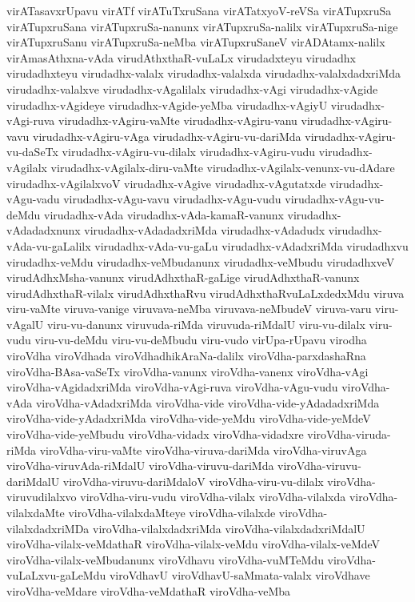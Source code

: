 {virATasavxrUpavu
virATf
virATuTxruSana
virATatxyoV-reVSa
virATupxruSa
virATupxruSana
virATupxruSa-nanunx
virATupxruSa-nalilx
virATupxruSa-nige
virATupxruSanu
virATupxruSa-neMba
virATupxruSaneV
virADAtamx-nalilx
virAmasAthxna-vAda
virudAthxthaR-vuLaLx
virudadxteyu
virudadhx
virudadhxteyu
virudadhx-valalx
virudadhx-valalxda
virudadhx-valalxdadxriMda
virudadhx-valalxve
virudadhx-vAgalilalx
virudadhx-vAgi
virudadhx-vAgide
virudadhx-vAgideye
virudadhx-vAgide-yeMba
virudadhx-vAgiyU
virudadhx-vAgi-ruva
virudadhx-vAgiru-vaMte
virudadhx-vAgiru-vanu
virudadhx-vAgiru-vavu
virudadhx-vAgiru-vAga
virudadhx-vAgiru-vu-dariMda
virudadhx-vAgiru-vu-daSeTx
virudadhx-vAgiru-vu-dilalx
virudadhx-vAgiru-vudu
virudadhx-vAgilalx
virudadhx-vAgilalx-diru-vaMte
virudadhx-vAgilalx-venunx-vu-dAdare
virudadhx-vAgilalxvoV
virudadhx-vAgive
virudadhx-vAgutatxde
virudadhx-vAgu-vadu
virudadhx-vAgu-vavu
virudadhx-vAgu-vudu
virudadhx-vAgu-vu-deMdu
virudadhx-vAda
virudadhx-vAda-kamaR-vanunx
virudadhx-vAdadadxnunx
virudadhx-vAdadadxriMda
virudadhx-vAdadudx
virudadhx-vAda-vu-gaLalilx
virudadhx-vAda-vu-gaLu
virudadhx-vAdadxriMda
virudadhxvu
virudadhx-veMdu
virudadhx-veMbudanunx
virudadhx-veMbudu
virudadhxveV
virudAdhxMsha-vanunx
virudAdhxthaR-gaLige
virudAdhxthaR-vanunx
virudAdhxthaR-vilalx
virudAdhxthaRvu
virudAdhxthaRvuLaLxdedxMdu
viruva
viru-vaMte
viruva-vanige
viruvava-neMba
viruvava-neMbudeV
viruva-varu
viru-vAgalU
viru-vu-danunx
viruvuda-riMda
viruvuda-riMdalU
viru-vu-dilalx
viru-vudu
viru-vu-deMdu
viru-vu-deMbudu
viru-vudo
virUpa-rUpavu
virodha
viroVdha
viroVdhada
viroVdhadhikAraNa-dalilx
viroVdha-parxdashaRna
viroVdha-BAsa-vaSeTx
viroVdha-vanunx
viroVdha-vanenx
viroVdha-vAgi
viroVdha-vAgidadxriMda
viroVdha-vAgi-ruva
viroVdha-vAgu-vudu
viroVdha-vAda
viroVdha-vAdadxriMda
viroVdha-vide
viroVdha-vide-yAdadadxriMda
viroVdha-vide-yAdadxriMda
viroVdha-vide-yeMdu
viroVdha-vide-yeMdeV
viroVdha-vide-yeMbudu
viroVdha-vidadx
viroVdha-vidadxre
viroVdha-viruda-riMda
viroVdha-viru-vaMte
viroVdha-viruva-dariMda
viroVdha-viruvAga
viroVdha-viruvAda-riMdalU
viroVdha-viruvu-dariMda
viroVdha-viruvu-dariMdalU
viroVdha-viruvu-dariMdaloV
viroVdha-viru-vu-dilalx
viroVdha-viruvudilalxvo
viroVdha-viru-vudu
viroVdha-vilalx
viroVdha-vilalxda
viroVdha-vilalxdaMte
viroVdha-vilalxdaMteye
viroVdha-vilalxde
viroVdha-vilalxdadxriMDa
viroVdha-vilalxdadxriMda
viroVdha-vilalxdadxriMdalU
viroVdha-vilalx-veMdathaR
viroVdha-vilalx-veMdu
viroVdha-vilalx-veMdeV
viroVdha-vilalx-veMbudanunx
viroVdhavu
viroVdha-vuMTeMdu
viroVdha-vuLaLxvu-gaLeMdu
viroVdhavU
viroVdhavU-saMmata-valalx
viroVdhave
viroVdha-veMdare
viroVdha-veMdathaR
viroVdha-veMba
}
